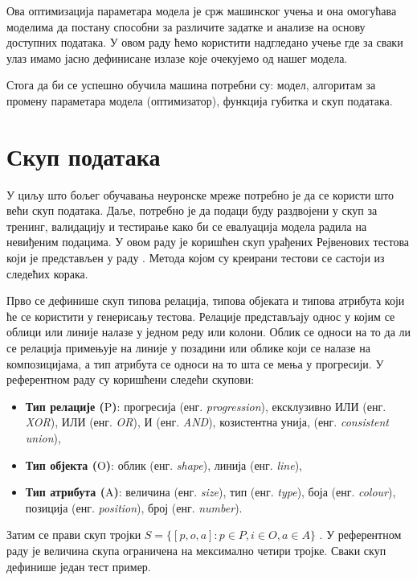 \documentclass[a4paper, 12pt, master, utf8]{etf}
\begin{document}
Ова оптимизација параметара модела је срж машинског учења и она омогућава моделима да постану 
способни за различите задатке и анализе на основу доступних података. 
У овом раду ћемо користити надгледано учење где
за сваки улаз имамо јасно дефинисане излазе које очекујемо од нашег модела.

Стога да би се успешно обучила машина потребни су: модел, алгоритам за промену параметара модела (оптимизатор), функција губитка и скуп података.

\section{Скуп података}
\label{sec:23}
У циљу што бољег обучавања неуронске мреже потребно је да се користи што већи скуп података. 
Даље, потребно је да подаци буду раздвојени у скуп за тренинг, валидацију и тестирање како би се евалуација 
модела радила на невиђеним подацима. У овом раду је коришћен скуп урађених Рејвенових тестова
који је представљен у раду \cite{barrett_measuring_2018}. Метода којом су креирани тестови се састоји из следећих корака.
\newline

Прво се дефинише скуп типова релација, типова објеката и типова атрибута који ће се користити у генерисању тестова. Релације представљају однос у којим се облици или линије налазе у једном реду или колони. 
Облик се односи на то да ли се релација примењује на линије у позадини или облике који се налазе на композицијама, а тип атрибута се односи на то шта се мења у прогресији.
У референтном раду су коришћени следећи скупови:

\begin{itemize}[noitemsep]
    \item  \textbf{Тип релације ($\mathrm{P}$)}: прогресија (енг. \textit{progression}), ексклузивно ИЛИ (енг. \textit{XOR}), ИЛИ (енг. \textit{OR}), И (енг. \textit{AND}), козистентна унија, (енг. \textit{consistent union}),
    \item  \textbf{Тип објекта ($\mathrm{O}$)}: облик (енг. \textit{shape}), линија (енг. \textit{line}),
    \item  \textbf{Тип атрибута ($\mathrm{A}$)}: величина (енг. \textit{size}), тип (енг. \textit{type}), боја (енг. \textit{colour}), позиција (енг. \textit{position}), број (енг. \textit{number}).
\end{itemize}

Затим се прави скуп тројки $S = \{[p, o, a]: p \in P, i \in O, a \in A\}$ . У референтном раду је величина скупа ограничена на мексимално четири тројке.
Сваки скуп дефинише један тест пример.
\newline
\end{document}
